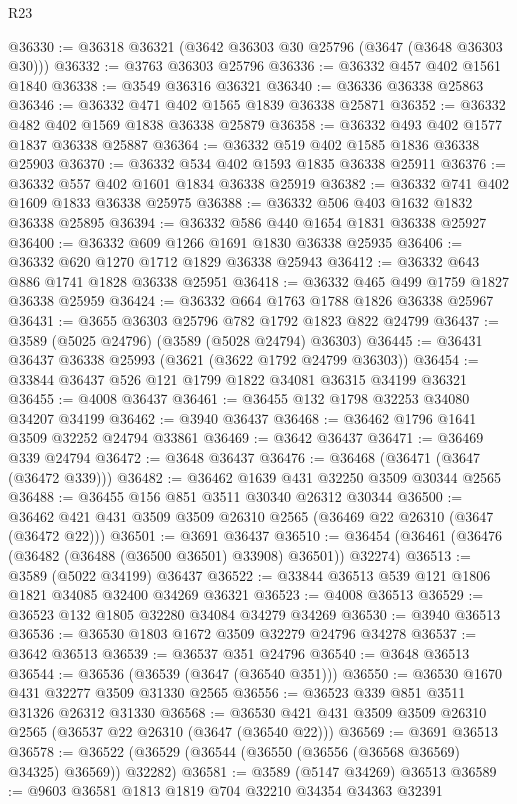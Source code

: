\begin{lexlean}{R23}
\begin{coremodule}
@36330 := @36318 @36321 (@3642 @36303 @30 @25796 (@3647 (@3648 @36303 @30)))
@36332 := @3763 @36303 @25796
@36336 := @36332 @457 @402 @1561 @1840
@36338 := @3549 @36316 @36321
@36340 := @36336 @36338 @25863
@36346 := @36332 @471 @402 @1565 @1839 @36338 @25871
@36352 := @36332 @482 @402 @1569 @1838 @36338 @25879
@36358 := @36332 @493 @402 @1577 @1837 @36338 @25887
@36364 := @36332 @519 @402 @1585 @1836 @36338 @25903
@36370 := @36332 @534 @402 @1593 @1835 @36338 @25911
@36376 := @36332 @557 @402 @1601 @1834 @36338 @25919
@36382 := @36332 @741 @402 @1609 @1833 @36338 @25975
@36388 := @36332 @506 @403 @1632 @1832 @36338 @25895
@36394 := @36332 @586 @440 @1654 @1831 @36338 @25927
@36400 := @36332 @609 @1266 @1691 @1830 @36338 @25935
@36406 := @36332 @620 @1270 @1712 @1829 @36338 @25943
@36412 := @36332 @643 @886 @1741 @1828 @36338 @25951
@36418 := @36332 @465 @499 @1759 @1827 @36338 @25959
@36424 := @36332 @664 @1763 @1788 @1826 @36338 @25967
@36431 := @3655 @36303 @25796 @782 @1792 @1823 @822 @24799
@36437 := @3589 (@5025 @24796) (@3589 (@5028 @24794) @36303)
@36445 := @36431 @36437 @36338 @25993 (@3621 (@3622 @1792 @24799 @36303))
@36454 := @33844 @36437 @526 @121 @1799 @1822 @34081 @36315 @34199 @36321
@36455 := @4008 @36437
@36461 := @36455 @132 @1798 @32253 @34080 @34207 @34199
@36462 := @3940 @36437
@36468 := @36462 @1796 @1641 @3509 @32252 @24794 @33861
@36469 := @3642 @36437
@36471 := @36469 @339 @24794
@36472 := @3648 @36437
@36476 := @36468 (@36471 (@3647 (@36472 @339)))
@36482 := @36462 @1639 @431 @32250 @3509 @30344 @2565
@36488 := @36455 @156 @851 @3511 @30340 @26312 @30344
@36500 := @36462 @421 @431 @3509 @3509 @26310 @2565 (@36469 @22 @26310 (@3647 (@36472 @22)))
@36501 := @3691 @36437
@36510 := @36454 (@36461 (@36476 (@36482 (@36488 (@36500 @36501) @33908) @36501)) @32274)
@36513 := @3589 (@5022 @34199) @36437
@36522 := @33844 @36513 @539 @121 @1806 @1821 @34085 @32400 @34269 @36321
@36523 := @4008 @36513
@36529 := @36523 @132 @1805 @32280 @34084 @34279 @34269
@36530 := @3940 @36513
@36536 := @36530 @1803 @1672 @3509 @32279 @24796 @34278
@36537 := @3642 @36513
@36539 := @36537 @351 @24796
@36540 := @3648 @36513
@36544 := @36536 (@36539 (@3647 (@36540 @351)))
@36550 := @36530 @1670 @431 @32277 @3509 @31330 @2565
@36556 := @36523 @339 @851 @3511 @31326 @26312 @31330
@36568 := @36530 @421 @431 @3509 @3509 @26310 @2565 (@36537 @22 @26310 (@3647 (@36540 @22)))
@36569 := @3691 @36513
@36578 := @36522 (@36529 (@36544 (@36550 (@36556 (@36568 @36569) @34325) @36569)) @32282)
@36581 := @3589 (@5147 @34269) @36513
@36589 := @9603 @36581 @1813 @1819 @704 @32210 @34354 @34363 @32391

\end{coremodule}
\end{lexlean}
